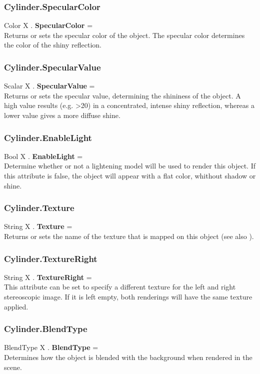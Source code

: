 \subsubsection{Cylinder.SpecularColor \label{F:Cylinder:SpecularColor}}
Color X . \textbf{SpecularColor} = \\
Returns or sets the specular color of the object. The specular color determines the color of the shiny reflection.

\subsubsection{Cylinder.SpecularValue \label{F:Cylinder:SpecularValue}}
Scalar X . \textbf{SpecularValue} = \\
Returns or sets the specular value, determining the shininess of the object. A high value results (e.g. >20) in a concentrated, intense shiny reflection, whereas a lower value gives a more diffuse shine.

\subsubsection{Cylinder.EnableLight \label{F:Cylinder:EnableLight}}
Bool X . \textbf{EnableLight} = \\
Determine whether or not a lightening model will be used to render this object. If this attribute is false, the object will appear with a flat color, whithout shadow or shine.

\subsubsection{Cylinder.Texture \label{F:Cylinder:Texture}}
String X . \textbf{Texture} = \\
Returns or sets the name of the texture that is mapped on this object (see also ).

\subsubsection{Cylinder.TextureRight \label{F:Cylinder:TextureRight}}
String X . \textbf{TextureRight} = \\
This attribute can be set to specify a different texture for the left and right stereoscopic image. If it is left empty, both renderings will have the same texture applied.

\subsubsection{Cylinder.BlendType \label{F:Cylinder:BlendType}}
BlendType X . \textbf{BlendType} = \\
Determines how the object is blended with the background when rendered in the scene.


